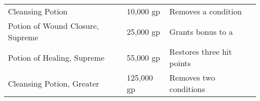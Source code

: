 \begin{longtabuwrapper}
\begin{longtabu}{l l l X l}
Cleansing Potion &  & 10,000 gp & Removes a condition & \pageref{item:Cleansing Potion} \\
Potion of Wound Closure, Supreme &  & 25,000 gp & Grants  bonus to a  & \pageref{item:Potion of Wound Closure, Supreme} \\
Potion of Healing, Supreme &  & 55,000 gp & Restores three hit points & \pageref{item:Potion of Healing, Supreme} \\
Cleansing Potion, Greater &  & 125,000 gp & Removes two conditions & \pageref{item:Cleansing Potion, Greater} \\
\end{longtabu}
\end{longtabuwrapper}
